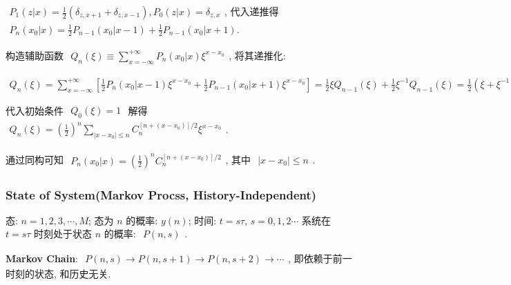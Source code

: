 \documentclass[../../main.tex]{subfiles}
\begin{document}
$\begin{aligned}
    P_{1}(z|x) = \frac{1}{2}\left(\delta_{z,x+1}+\delta_{z,x-1}\right), P_{0}(z|x) = \delta_{z,x}
\end{aligned}$, 代入递推得 $\begin{aligned}
    P_{n}(x_{0}|x) = \frac{1}{2}P_{n-1}(x_{0}|x-1) + \frac{1}{2}P_{n-1}(x_{0}|x+1). 
\end{aligned}$

构造辅助函数 $\begin{aligned}
    Q_{n}(\xi)\equiv \sum_{x=-\infty}^{+\infty}P_{n}(x_{0}|x)\xi^{x-x_{0}}
\end{aligned}$, 将其递推化: 

$\begin{aligned}
     Q_{n}(\xi) = \sum_{x=-\infty}^{+\infty}\left[\frac{1}{2}P_{n}(x_{0}|x-1)\xi^{x-x_{0}} + \frac{1}{2}P_{n-1}(x_{0}|x+1)\xi^{x-x_{0}}\right] = \frac{1}{2}\xi Q_{n-1}(\xi) + \frac{1}{2}\xi^{-1}Q_{n-1}(\xi) = \frac{1}{2}\left(\xi + \xi^{-1}\right)Q_{n-1}(\xi)
\end{aligned}$

代入初始条件 $\begin{aligned}
    Q_{0}(\xi) = 1
\end{aligned}$ 解得 $\begin{aligned}
    Q_{n}(\xi) = \left(\frac{1}{2}\right)^{n}\sum_{|x-x_{0}|\leq n}C_{n}^{[n+(x-x_{0})]/2}\xi^{x-x_{0}}
\end{aligned}$. 

通过同构可知 $\begin{aligned}
    P_{n}(x_{0}|x) = \left(\frac{1}{2}\right)^{n}C_{n}^{[n+(x-x_{0})]/2}
\end{aligned}$, 其中 $\begin{aligned}
    |x-x_{0}|\leq n
\end{aligned}$. 

\subsubsection{State of System(Markov Procss, History-Independent)}

态: $n = 1,2,3,\cdots,M$; 
态为 $n$ 的概率: $y(n)$; 
时间: $t = s\tau$, $s = 0,1,2\cdots$
系统在 $t=s\tau$ 时刻处于状态 $n$ 的概率: $\begin{aligned}
    P(n,s)
\end{aligned}$. 

\textbf{Markov Chain}: $\begin{aligned}
    P(n,s)\rightarrow P(n,s+1)\rightarrow P(n,s+2)\rightarrow\cdots
\end{aligned}$, 即依赖于前一时刻的状态, 和历史无关.
\end{document}
